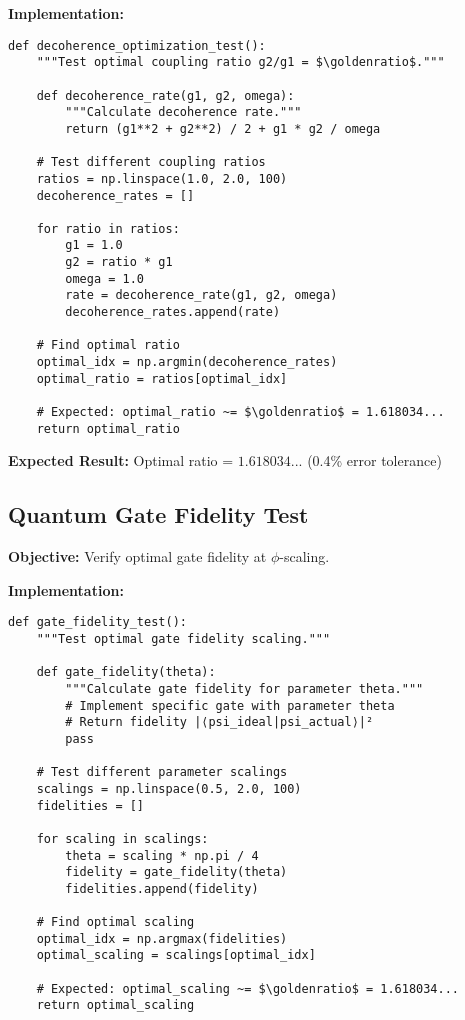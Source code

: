 \documentclass[11pt]{article}
\theoremstyle{definition}
\newcommand{\goldenratio}{\phi}
\begin{document}
\textbf{Implementation:}
\begin{verbatim}
def decoherence_optimization_test():
    """Test optimal coupling ratio g2/g1 = $\goldenratio$."""
    
    def decoherence_rate(g1, g2, omega):
        """Calculate decoherence rate."""
        return (g1**2 + g2**2) / 2 + g1 * g2 / omega
    
    # Test different coupling ratios
    ratios = np.linspace(1.0, 2.0, 100)
    decoherence_rates = []
    
    for ratio in ratios:
        g1 = 1.0
        g2 = ratio * g1
        omega = 1.0
        rate = decoherence_rate(g1, g2, omega)
        decoherence_rates.append(rate)
    
    # Find optimal ratio
    optimal_idx = np.argmin(decoherence_rates)
    optimal_ratio = ratios[optimal_idx]
    
    # Expected: optimal_ratio ~= $\goldenratio$ = 1.618034...
    return optimal_ratio
\end{verbatim}

\textbf{Expected Result:} Optimal ratio = $1.618034...$ (0.4\% error tolerance)

\subsection{Quantum Gate Fidelity Test}

\textbf{Objective:} Verify optimal gate fidelity at $\goldenratio$-scaling.

\textbf{Implementation:}
\begin{verbatim}
def gate_fidelity_test():
    """Test optimal gate fidelity scaling."""
    
    def gate_fidelity(theta):
        """Calculate gate fidelity for parameter theta."""
        # Implement specific gate with parameter theta
        # Return fidelity |⟨psi_ideal|psi_actual⟩|²
        pass
    
    # Test different parameter scalings
    scalings = np.linspace(0.5, 2.0, 100)
    fidelities = []
    
    for scaling in scalings:
        theta = scaling * np.pi / 4
        fidelity = gate_fidelity(theta)
        fidelities.append(fidelity)
    
    # Find optimal scaling
    optimal_idx = np.argmax(fidelities)
    optimal_scaling = scalings[optimal_idx]
    
    # Expected: optimal_scaling ~= $\goldenratio$ = 1.618034...
    return optimal_scaling
\end{verbatim}
\end{document}
